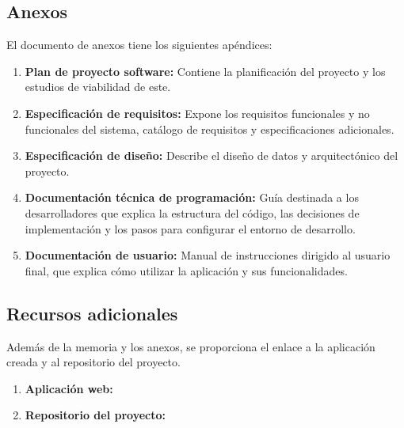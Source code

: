\subsection{Anexos}

El documento de anexos tiene los siguientes apéndices:

\begin{enumerate}[label=\Alph*]
	\item \textbf{Plan de proyecto software:} Contiene la planificación del proyecto y los estudios de viabilidad de este.
	 
	\item \textbf{Especificación de requisitos:} Expone los requisitos funcionales y no funcionales del sistema, catálogo de requisitos y especificaciones adicionales.
	
	\item \textbf{Especificación de diseño:} Describe el diseño de datos y arquitectónico del proyecto.
	
	\item \textbf{Documentación técnica de programación:} Guía destinada a los desarrolladores que explica la estructura del código, las decisiones de implementación y los pasos para configurar el entorno de desarrollo.
	
	\item \textbf{Documentación de usuario:} Manual de instrucciones dirigido al usuario final, que explica cómo utilizar la aplicación y sus funcionalidades.
\end{enumerate}

\subsection{Recursos adicionales}

Además de la memoria y los anexos, se proporciona el enlace a la aplicación creada y al repositorio del proyecto.

\begin{enumerate}
	\item \textbf{Aplicación web:} 
	
	\item \textbf{Repositorio del proyecto:} 
\end{enumerate}
